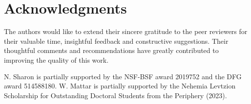 \documentclass[12pt]{article}
\begin{document}

\section*{Acknowledgments}
The authors would like to extend their sincere gratitude to the peer reviewers for their valuable time, insightful feedback and constructive suggestions. Their thoughtful comments and recommendations have greatly contributed to improving the quality of this work.

N. Sharon is partially supported by the NSF-BSF award 2019752 and the DFG award 514588180. W. Mattar is partially supported by the Nehemia Levtzion Scholarship for Outstanding Doctoral Students from the Periphery (2023).




\end{document}
